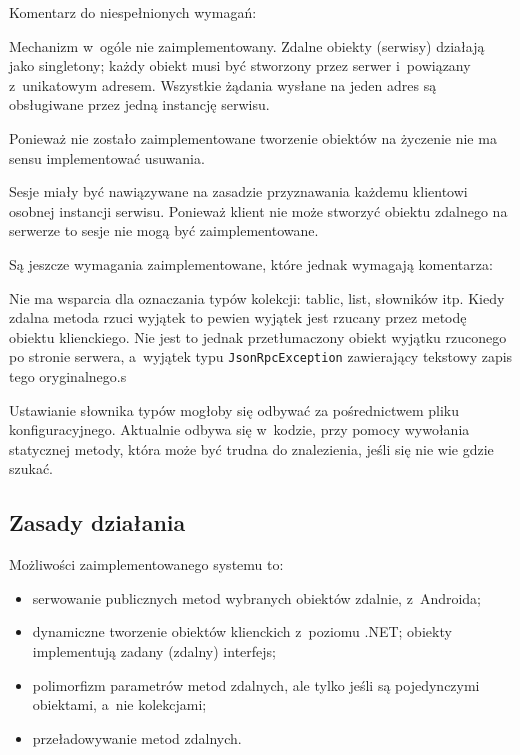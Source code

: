 Komentarz do niespełnionych wymagań:
\begin{description}
Mechanizm w~ogóle nie zaimplementowany. Zdalne obiekty (serwisy) działają jako singletony; każdy obiekt musi być stworzony przez serwer i~powiązany z~unikatowym adresem. Wszystkie żądania wysłane na jeden adres są obsługiwane przez jedną instancję serwisu.

Ponieważ nie zostało zaimplementowane tworzenie obiektów na życzenie nie ma sensu implementować usuwania.

Sesje miały być nawiązywane na zasadzie przyznawania każdemu klientowi osobnej instancji serwisu. Ponieważ klient nie może stworzyć obiektu zdalnego na serwerze to sesje nie mogą być zaimplementowane.
\end{description}

Są jeszcze wymagania zaimplementowane, które jednak wymagają komentarza:
\begin{description}
Nie ma wsparcia dla oznaczania typów kolekcji: tablic, list, słowników itp.
Kiedy zdalna metoda rzuci wyjątek to pewien wyjątek jest rzucany przez metodę obiektu klienckiego. Nie jest to jednak przetłumaczony obiekt wyjątku rzuconego po stronie serwera, a~wyjątek typu \texttt{JsonRpcException} zawierający tekstowy zapis tego oryginalnego.s

Ustawianie słownika typów mogłoby się odbywać za pośrednictwem pliku konfiguracyjnego. Aktualnie odbywa się w~kodzie, przy pomocy wywołania statycznej metody, która może być trudna do znalezienia, jeśli się nie wie gdzie szukać.
\end{description}


\subsection{Zasady działania}
Możliwości zaimplementowanego systemu to:
\begin{itemize}
	\item serwowanie publicznych metod wybranych obiektów zdalnie, z~Androida;
	\item dynamiczne tworzenie obiektów klienckich z~poziomu .NET; obiekty implementują zadany (zdalny) interfejs;
	\item polimorfizm parametrów metod zdalnych, ale tylko jeśli są pojedynczymi obiektami, a~nie kolekcjami;
	\item przeładowywanie metod zdalnych.
\end{itemize}

